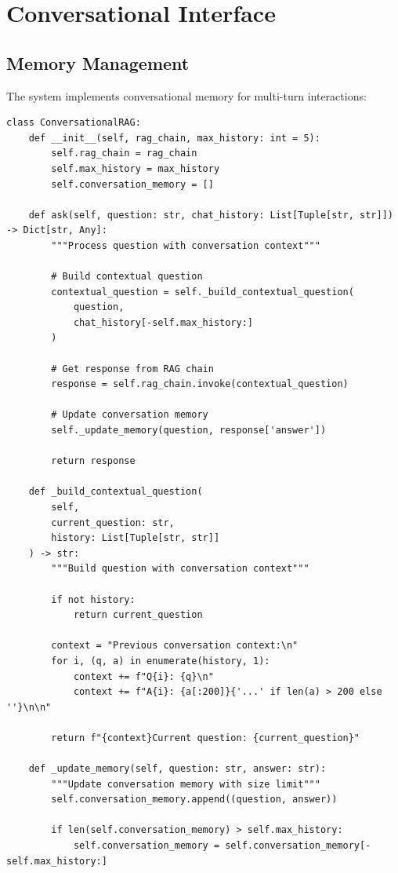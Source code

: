 \documentclass[12pt,a4paper]{article}
\begin{document}
\section{Conversational Interface}

\subsection{Memory Management}

The system implements conversational memory for multi-turn interactions:

\begin{lstlisting}[caption=Conversational RAG Implementation]
class ConversationalRAG:
    def __init__(self, rag_chain, max_history: int = 5):
        self.rag_chain = rag_chain
        self.max_history = max_history
        self.conversation_memory = []
    
    def ask(self, question: str, chat_history: List[Tuple[str, str]]) -> Dict[str, Any]:
        """Process question with conversation context"""
        
        # Build contextual question
        contextual_question = self._build_contextual_question(
            question, 
            chat_history[-self.max_history:]
        )
        
        # Get response from RAG chain
        response = self.rag_chain.invoke(contextual_question)
        
        # Update conversation memory
        self._update_memory(question, response['answer'])
        
        return response
    
    def _build_contextual_question(
        self, 
        current_question: str, 
        history: List[Tuple[str, str]]
    ) -> str:
        """Build question with conversation context"""
        
        if not history:
            return current_question
        
        context = "Previous conversation context:\n"
        for i, (q, a) in enumerate(history, 1):
            context += f"Q{i}: {q}\n"
            context += f"A{i}: {a[:200]}{'...' if len(a) > 200 else ''}\n\n"
        
        return f"{context}Current question: {current_question}"
    
    def _update_memory(self, question: str, answer: str):
        """Update conversation memory with size limit"""
        self.conversation_memory.append((question, answer))
        
        if len(self.conversation_memory) > self.max_history:
            self.conversation_memory = self.conversation_memory[-self.max_history:]
\end{lstlisting}
\end{document}
